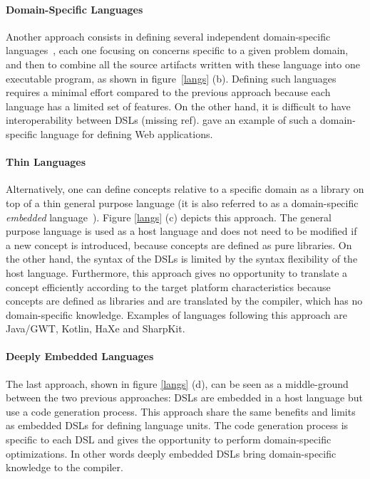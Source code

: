 \documentclass[preprint]{sigplanconf}
\begin{document}
\paragraph{Domain-Specific Languages}

Another approach consists in defining several independent domain-specific
languages~\cite{Van00_DSL}, each one focusing on concerns specific to a given problem domain, and
then to combine all the source artifacts written with these language into one executable program, as
shown in figure~\ref{langs} (b). Defining such languages requires a minimal effort compared to the
previous approach because each language has a limited set of features. On the other hand, it is
difficult to have interoperability between DSLs (missing ref). \cite{Groenewegen08_WebDSL} gave an
example of such a domain-specific language for defining Web applications.

\paragraph{Thin Languages}

Alternatively, one can define concepts relative to a specific domain as a library on top of a thin
general purpose language (it is also referred to as a domain-specific \emph{embedded}
language~\cite{Hudak96_DSEL}). Figure \ref{langs} (c) depicts this approach. The general purpose
language is used as a host language and does not need to be modified if a new concept is introduced,
because concepts are defined as pure libraries. On the other hand, the syntax of the DSLs is limited
by the syntax flexibility of the host language. Furthermore, this approach gives no opportunity to
translate a concept efficiently according to the target platform characteristics because concepts
are defined as libraries and are translated by the compiler, which has no domain-specific knowledge.
Examples of languages following this approach are Java/GWT, Kotlin, HaXe and SharpKit.

\paragraph{Deeply Embedded Languages}

The last approach, shown in figure \ref{langs} (d), can be seen as a middle-ground between the two
previous approaches: DSLs are embedded in a host language but use a code generation process. This
approach share the same benefits and limits as embedded DSLs for defining language units. The code
generation process is specific to each DSL and gives the opportunity to perform domain-specific
optimizations. In other words deeply embedded DSLs bring domain-specific knowledge to the compiler.
\end{document}
